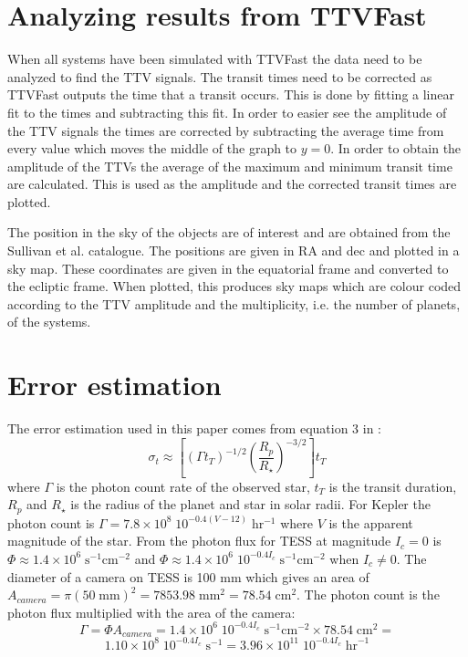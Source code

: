 \documentclass[12pt]{report}
\begin{document}
\section{Analyzing results from TTVFast}
	When all systems have been simulated with TTVFast the data need to be analyzed to find the TTV signals. The transit times need to be corrected as TTVFast outputs the time that a transit occurs. This is done by fitting a linear fit to the times and subtracting this fit. In order to easier see the amplitude of the TTV signals the times are corrected by subtracting the average time from every value which moves the middle of the graph to $y=0$. In order to obtain the amplitude of the TTVs the average of the maximum and minimum transit time are calculated. This is used as the amplitude and the corrected transit times are plotted.
	
	The position in the sky of the objects are of interest and are obtained from the Sullivan et al. catalogue. The positions are given in RA and dec and plotted in a sky map. These coordinates are given in the equatorial frame and converted to the ecliptic frame. When plotted, this produces sky maps which are colour coded according to the TTV amplitude and the multiplicity, i.e. the number of planets, of the systems.
	

\section{Error estimation}
	The error estimation used in this paper comes from equation 3 in \cite{2005Sci...307.1288H}:
	\begin{equation}
		\sigma_t \approx \left[\left(\Gamma t_T\right)^{-1/2}  \left(\frac{R_p}{R_{\star}}\right)^{-3/2}\right] t_T
	\end{equation}
	where $\Gamma$ is the photon count rate of the observed star, $t_T$ is the transit duration, $R_p$ and $R_{\star}$ is the radius of the planet and star in solar radii. For Kepler the photon count is $\Gamma = 7.8 \times 10^8\; 10^{-0.4(V-12)} \; \mathrm{hr^{-1}}$ where $V$ is the apparent magnitude of the star. From \cite{2015ApJ...809...77S} the photon flux for TESS at magnitude $I_c=0$ is $\Phi \approx 1.4 \times 10^6 \; \mathrm{s^{-1} cm^{-2}}$ and $\Phi \approx 1.4 \times 10^6 \; 10^{-0.4I_c} \; \mathrm{s^{-1} cm^{-2}}$ when $I_c \neq 0$. The diameter of a camera on TESS is 100 mm which gives an area of $A_{camera} = \pi (50 \; \mathrm{mm})^2 = 7853.98 \; \mathrm{mm}^2 = 78.54 \; \mathrm{cm}^2$. The photon count is the photon flux multiplied with the area of the camera:
	\begin{equation}
		\Gamma = \Phi A_{camera} = 1.4 \times 10^6\; 10^{-0.4I_c} \; \mathrm{s^{-1} cm^{-2}} \times 78.54 \; \mathrm{cm}^2 = 
	\end{equation}
	\begin{equation}
	1.10 \times 10^{8}\; 10^{-0.4I_c} \; \mathrm{s}^{-1} = 3.96 \times 10^{11} \; 10^{-0.4I_c} \; \mathrm{hr}^{-1}
	\end{equation}
\end{document}
